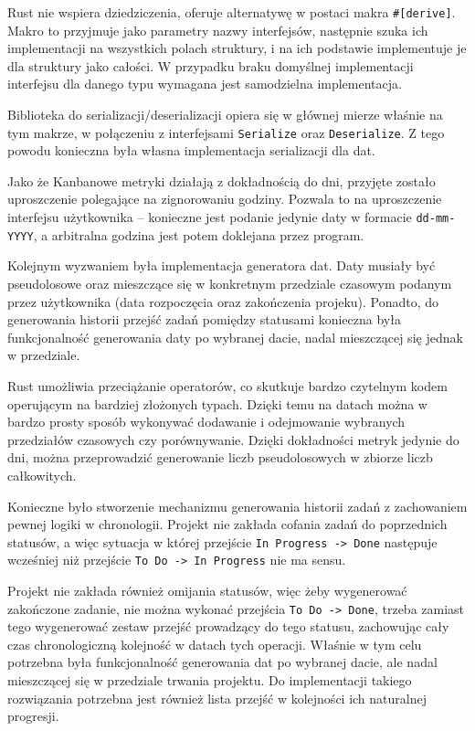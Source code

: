 Rust nie wspiera dziedziczenia, oferuje alternatywę w postaci makra \texttt{\#[derive]}. Makro to przyjmuje jako parametry
nazwy interfejsów, następnie szuka ich implementacji na wszystkich polach struktury, i na ich podstawie implementuje je dla struktury jako
całości. W przypadku braku domyślnej implementacji interfejsu dla danego typu wymagana jest samodzielna implementacja.

Biblioteka do serializacji/deserializacji opiera się w głównej mierze właśnie na tym makrze, w połączeniu z interfejsami \texttt{Serialize} oraz \texttt{Deserialize}.
Z tego powodu konieczna była własna implementacja serializacji dla dat.

Jako że Kanbanowe metryki działają z dokładnością do dni, przyjęte zostało uproszczenie polegające na zignorowaniu godziny.
Pozwala to na uproszczenie interfejsu użytkownika -- konieczne jest podanie jedynie daty w formacie \texttt{dd-mm-YYYY}, a arbitralna
godzina jest potem doklejana przez program.

Kolejnym wyzwaniem była implementacja generatora dat. Daty musiały być pseudolosowe oraz mieszczące się w konkretnym przedziale czasowym
podanym przez użytkownika (data rozpoczęcia oraz zakończenia projeku). Ponadto, do generowania historii przejść zadań pomiędzy statusami
konieczna była funkcjonalność generowania daty po wybranej dacie, nadal mieszczącej się jednak w przedziale.

Rust umożliwia przeciążanie operatorów, co skutkuje bardzo czytelnym kodem operującym na bardziej złożonych typach.
Dzięki temu na datach można w bardzo prosty sposób wykonywać dodawanie i odejmowanie wybranych przedziałów czasowych czy porównywanie.
Dzięki dokładności metryk jedynie do dni, można przeprowadzić generowanie liczb pseudolosowych w zbiorze liczb całkowitych.

Konieczne było stworzenie mechanizmu generowania historii zadań z zachowaniem pewnej logiki w chronologii.
Projekt nie zakłada cofania zadań do poprzednich statusów, a więc sytuacja w której przejście \texttt{In Progress -> Done} następuje
wcześniej niż przejście \texttt{To Do -> In Progress} nie ma sensu.

Projekt nie zakłada również omijania statusów, więc żeby wygenerować zakończone zadanie, nie można wykonać przejścia \texttt{To Do -> Done},
trzeba zamiast tego wygenerować zestaw przejść prowadzący do tego statusu, zachowując cały czas chronologiczną kolejność w datach
tych operacji. Właśnie w tym celu potrzebna była funkcjonalność generowania dat po wybranej dacie, ale nadal mieszczącej się w przedziale trwania projektu.
Do implementacji takiego rozwiązania potrzebna jest również lista przejść w kolejności ich naturalnej progresji.

